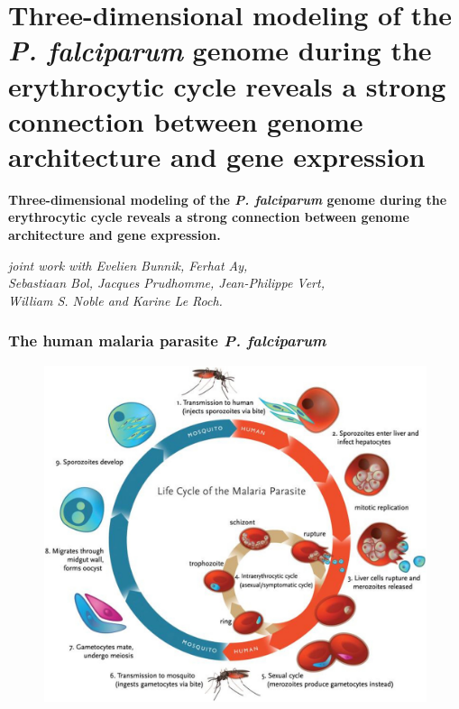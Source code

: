 \documentclass[xcolor=dvipsnames]{beamer}
\begin{document}
\section{Three-dimensional modeling of the {\em P. falciparum} genome
during the erythrocytic cycle reveals a strong connection between genome
architecture and gene expression}

\begin{frame}

\Large{ \bf
Three-dimensional modeling of the \textit{P. falciparum} genome
during the erythrocytic cycle reveals a strong connection between genome
architecture and gene expression.}

\begin{flushright}
\vspace{1em}
\small
\textit{joint work with 
Evelien Bunnik, Ferhat Ay, \\
Sebastiaan Bol, Jacques Prudhomme, Jean-Philippe Vert, \\ William S. Noble and Karine
Le Roch.}
\end{flushright}

\end{frame}

\begin{frame}
\frametitle{The human malaria parasite {\em P. falciparum}}

\begin{figure}
\includegraphics[width=0.75\linewidth]{figures/plasmodium_lifecycle.jpg}
\end{figure}
\end{frame}
\end{document}
